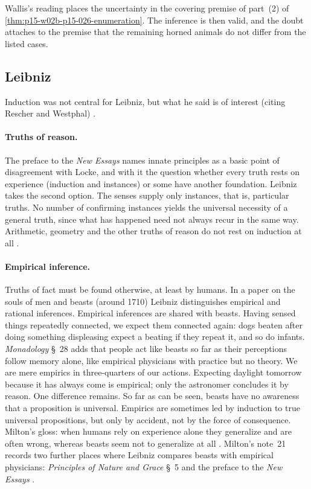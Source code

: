 Wallis's reading places the uncertainty in the covering premise of
part~(2) of \cref{thm:p15-w02b-p15-026-enumeration}. The inference is then
valid, and the doubt attaches to the premise that the remaining horned
animals do not differ from the listed cases.

\subsection{Leibniz}
\label{sec:p15-w02b-p15-026-leibniz}

Induction was not central for Leibniz, but what he said is of interest
(citing Rescher and Westphal) \cite[p.~33]{Milton2011InductionBeforeHume}.

\paragraph{Truths of reason.}
The preface to the \emph{New Essays} names innate principles as a basic
point of disagreement with Locke, and with it the question whether every
truth rests on experience (induction and instances) or some have another
foundation. Leibniz takes the second option. The senses supply only
instances, that is, particular truths. No number of confirming instances
yields the universal necessity of a general truth, since what has happened
need not always recur in the same way. Arithmetic, geometry and the other
truths of reason do not rest on induction at all
\cite[p.~33]{Milton2011InductionBeforeHume}.

\paragraph{Empirical inference.}
Truths of fact must be found otherwise, at least by humans. In a paper on
the souls of men and beasts (around 1710) Leibniz distinguishes empirical
and rational inferences. Empirical inferences are shared with beasts. Having
sensed things repeatedly connected, we expect them connected again: dogs
beaten after doing something displeasing expect a beating if they repeat
it, and so do infants. \emph{Monadology} \S~28 adds that people act like
beasts so far as their perceptions follow memory alone, like empirical
physicians with practice but no theory. We are mere empirics in
three-quarters of our actions. Expecting daylight tomorrow because it has
always come is empirical; only the astronomer concludes it by reason. One
difference remains. So far as can be seen, beasts have no awareness that a
proposition is universal. Empirics are sometimes led by induction to
true universal propositions, but only by accident, not by the force of
consequence. Milton's gloss: when humans rely on experience alone they
generalize and are often wrong, whereas beasts seem not to generalize at all
\cite[p.~34]{Milton2011InductionBeforeHume}. Milton's note~21 records two further places where Leibniz
compares beasts with empirical physicians: \emph{Principles of Nature and
Grace} \S~5 and the preface to the \emph{New Essays}
\cite[pp.~33--34, n.~21]{Milton2011InductionBeforeHume}.


